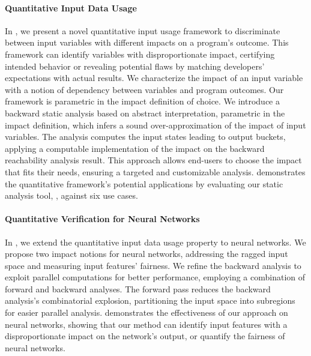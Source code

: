 \paragraph{Quantitative Input Data Usage}
In , we present a novel quantitative input usage framework to discriminate between input variables with different impacts on a program's outcome.
This framework can identify variables with disproportionate impact, certifying intended behavior or revealing potential flaws by matching developers' expectations with actual results.
We characterize the impact of an input variable with a notion of dependency between variables and program outcomes.
Our framework is parametric in the impact definition of choice.
%
We introduce a backward static analysis based on abstract interpretation, parametric in the impact definition, which infers a sound over-approximation of the impact of input variables.
The analysis computes the input states leading to output buckets, applying a computable implementation of the impact on the backward reachability analysis result.
This approach allows end-users to choose the impact that fits their needs, ensuring a targeted and customizable analysis.
 demonstrates the quantitative framework's potential applications by evaluating our static analysis tool, \impatto\sidenote{\impattourl}, against six use cases.



\paragraph{Quantitative Verification for Neural Networks}
In , we extend the quantitative input data usage property to neural networks.
We propose two impact notions for neural networks, addressing the ragged input space and measuring input features' fairness.
We refine the backward analysis to exploit parallel computations for better performance, employing a combination of forward and backward analyses.
The forward pass reduces the backward analysis's combinatorial explosion, partitioning the input space into subregions for easier parallel analysis.
 demonstrates the effectiveness of our approach on neural networks, showing that our method can identify input features with a disproportionate impact on the network's output, or quantify the fairness of neural networks.

